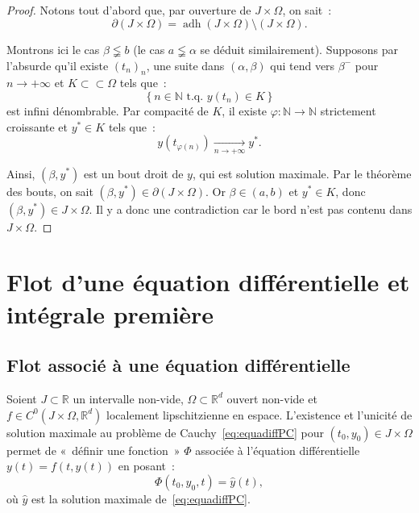 \documentclass{report}
\theoremstyle{definition}
\theoremstyle{remark}
\numberwithin{equation}{section}
\newcommand{\R}{\mathbb R}
\newcommand{\N}{\mathbb N}
\newcommand{\tq}{\text{ t.q. }}
\DeclareMathOperator{\adh}{adh}
\newcommand{\pinfty}{{+\infty}}
\newcommand{\subscpct}{\subset\subset}
\begin{document}
			\begin{proof} Notons tout d'abord que, par ouverture de $J \times \Omega$, on sait~:
			\begin{equation}
				\partial(J \times \Omega) = \adh(J \times \Omega) \setminus (J \times \Omega).
			\end{equation}

			Montrons ici le cas $\beta \lneqq b$ (le cas $a \lneqq \alpha$ se déduit similairement). Supposons par l'absurde qu'il existe $(t_n)_n$, une suite dans
			$(\alpha, \beta)$ qui tend vers $\beta^-$ pour $n \to \pinfty$ et $K \subscpct \Omega$ tels que~:
			\begin{equation}
				\left\{n \in \N \tq y(t_n) \in K\right\}
			\end{equation}
			est infini dénombrable. Par compacité de $K$, il existe $\varphi : \N \to \N$ strictement croissante et $y^* \in K$ tels que~:
			\begin{equation}
				y(t_{\varphi(n)}) \xrightarrow[n \to \pinfty]{} y^*.
			\end{equation}

			Ainsi, $(\beta, y^*)$ est un bout droit de $y$, qui est solution maximale. Par le théorème des bouts, on sait $(\beta, y^*) \in \partial (J \times \Omega)$.
			Or $\beta \in (a, b)$ et $y^* \in K$, donc $(\beta, y^*) \in J \times \Omega$. Il y a donc une contradiction car le bord n'est pas contenu dans
			$J \times \Omega$.
			\end{proof}

	\section{Flot d'une équation différentielle et intégrale première}
		\subsection{Flot associé à une équation différentielle}
			Soient $J \subset \R$ un intervalle non-vide, $\Omega \subset \R^d$ ouvert non-vide et $f \in C^0(J \times \Omega, \R^d)$ localement lipschitzienne
			en espace. L'existence et l'unicité de solution maximale au problème de Cauchy~\eqref{eq:equadiffPC} pour $(t_0, y_0) \in J \times \Omega$ permet
			de «~définir une fonction~» $\Phi$ associée à l'équation différentielle $y(t) = f(t, y(t))$ en posant~:
			\begin{equation}
				\Phi(t_0, y_0, t) = \hat y(t),
			\end{equation}
			où $\hat y$ est la solution maximale de~\eqref{eq:equadiffPC}.
\end{document}
